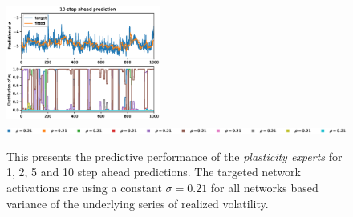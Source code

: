 \begin{figure}[H]
\begin{center}
        \includegraphics[width=0.45\textwidth]{Plots/Prediction/Plasticity_Constant_Low_rolling_10step.eps} \\
        \includegraphics[width=1.0\textwidth]{Plots/Prediction/legend_Constant_Low.eps}
    \end{center}
    \caption{This presents the predictive performance of the \textit{plasticity experts} for 1, 2, 5 and 10 step ahead predictions. The targeted network activations are using a constant $\sigma = 0.21$ for all networks based variance of the underlying series of realized volatility.}
    \label{FIG:PlasticityConstantLow}
\end{figure}

